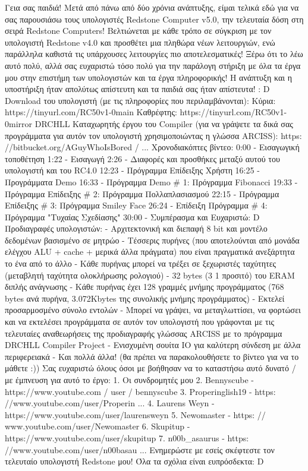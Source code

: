 \documentclass[11pt,a4paper,notitlepage,fleqn]{article}
\begin{document}
Γεια σας παιδιά! Μετά από πάνω από δύο χρόνια ανάπτυξης, είμαι τελικά εδώ για να σας παρουσιάσω τους υπολογιστές Redstone Computer v5.0, την τελευταία δόση στη σειρά Redstone Computers! Βελτιώνεται με κάθε τρόπο σε σύγκριση με τον υπολογιστή Redstone v4.0 και προσθέτει μια πληθώρα νέων λειτουργιών, ενώ παράλληλα καθιστά τις υπάρχουσες λειτουργίες πιο αποτελεσματικές! Ξέρω ότι το λέω αυτό πολύ, αλλά σας ευχαριστώ τόσο πολύ για την παράλογη στήριξη με όλα τα έργα μου στην επιστήμη των υπολογιστών και τα έργα πληροφορικής! Η ανάπτυξη και η υποστήριξη ήταν απολύτως απίστευτη και τα παιδιά σας ήταν απίστευτα! : D Download του υπολογιστή (με τις πληροφορίες που περιλαμβάνονται): Κύρια: https://tinyurl.com/RC50v1-0main Καθρέφτης: https://tinyurl.com/RC50v1-0mirror DRCHLL Καταχωρητής έργου του Compiler (για να γράψετε τα δικά σας προγράμματα για αυτόν τον υπολογιστή χρησιμοποιώντας η γλώσσα ARCISS): https: //bitbucket.org/AGuyWhoIsBored / ... Χρονοδιακόπτες βίντεο: 0:00 - Εισαγωγική τοποθέτηση 1:22 - Εισαγωγή 2:26 - Διαφορές και προσθήκες μεταξύ αυτού του υπολογιστή και του RC4.0 12:23 - Πρόγραμμα Επίδειξης Χρήστη 16:25 - Προγράμματα Demo 16:33 - Πρόγραμμα Demo \# 1: Πρόγραμμα Fibonacci 19:33 - Πρόγραμμα Επίδειξης \# 2: Πρόγραμμα Πολλαπλασιασμού 22:15 - Πρόγραμμα Επίδειξης \# 3: Πρόγραμμα Smiley Face 26:24 - Επίδειξη Πρόγραμμα \# 4: Πρόγραμμα "Τυχαίας Σχεδίασης" 30:00 - Συμπέρασμα και Ευχαριστώ: D Προδιαγραφές υπολογιστών: - Αρχιτεκτονική και διεπαφή 8 bit και μοντέλο δεδομένων βασισμένο σε μητρώο - Τέσσερις πυρήνες (που αποτελούνται από μονάδα ελέγχου ALU + cache + μερικά άλλα πράγματα) που είναι πραγματικά ανεξάρτητα το ένα από το άλλο - Κάθε πυρήνας μπορεί να τρέξει σε ξεχωριστές ταχύτητες (μεταβλητή ταχύτητα ολοκλήρωσης ρολογιού) - 32 bytes (3 1 προσιτό) του ERAM διπλής ανάγνωσης - Κάθε πυρήνας έχει 128 γραμμές μνήμης προγράμματος (768 bytes ανά πυρήνα, 3.072Kbytes της συνολικής μνήμης προγράμματος) - Εκτελεί προσαρμοσμένο σύνολο εντολών - Μπορεί να γράψει, να μεταγλωττίσει, να φορτώσει και να εκτελέσει προγράμματα σε αυτόν τον υπολογιστή που γράφονται με τις τελευταίες αναθεωρήσεις της προδιαγραφής γλώσσας ARCISS με το πρόγραμμα DRCHLL Compiler Project - Ενισχυμένη σουίτα IO για καλύτερη σύνδεση με άλλα περιφερειακά - Και πολλά άλλα! (θα πρέπει να παρακολουθήσετε το βίντεο για να το μάθετε :)) Σας ευχαριστώ όλους όσοι με βοήθησαν να το καταστήσω αυτό δυνατό / με έμπνευση για αυτό το έργο: 1. Οι συνδρομητές μου 2. Bennyscube - https://www.youtube.com / user / bennyscube 3. Properinglish19 - https: //www.youtube.com/user/Properin ... 4. Laurens Weyn - https://www.youtube.com/user/laurensweyn 5. Newomaster - https: // www.youtube.com/user/Newomaster 6. Skupitup - https://www.youtube.com/user/skupitup 7. n00b\_asaurus - https: //www.youtube.com/user/n00basau ... Ενημερώστε με εσείς σκέφτεστε τον τελευταίο υπολογιστή Redstone μου! Όλα τα σχόλια είναι ευπρόσδεκτα: D
\end{document}
